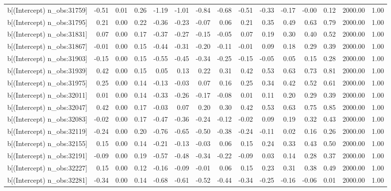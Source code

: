 \begin{table}[ht]
\begin{tabular}{rrrrrrrrrrrrrrr}
  b[(Intercept) n\_obs:31759] & -0.51 & 0.01 & 0.26 & -1.19 & -1.01 & -0.84 & -0.68 & -0.51 & -0.33 & -0.17 & -0.00 & 0.12 & 2000.00 & 1.00 \\ 
  b[(Intercept) n\_obs:31795] & 0.21 & 0.00 & 0.22 & -0.36 & -0.23 & -0.07 & 0.06 & 0.21 & 0.35 & 0.49 & 0.63 & 0.79 & 2000.00 & 1.00 \\ 
  b[(Intercept) n\_obs:31831] & 0.07 & 0.00 & 0.17 & -0.37 & -0.27 & -0.15 & -0.05 & 0.07 & 0.19 & 0.30 & 0.40 & 0.52 & 2000.00 & 1.00 \\ 
  b[(Intercept) n\_obs:31867] & -0.01 & 0.00 & 0.15 & -0.44 & -0.31 & -0.20 & -0.11 & -0.01 & 0.09 & 0.18 & 0.29 & 0.39 & 2000.00 & 1.00 \\ 
  b[(Intercept) n\_obs:31903] & -0.15 & 0.00 & 0.15 & -0.55 & -0.45 & -0.34 & -0.25 & -0.15 & -0.05 & 0.05 & 0.15 & 0.28 & 2000.00 & 1.00 \\ 
  b[(Intercept) n\_obs:31939] & 0.42 & 0.00 & 0.15 & 0.05 & 0.13 & 0.22 & 0.31 & 0.42 & 0.53 & 0.63 & 0.73 & 0.81 & 2000.00 & 1.00 \\ 
  b[(Intercept) n\_obs:31975] & 0.25 & 0.00 & 0.14 & -0.13 & -0.03 & 0.07 & 0.16 & 0.25 & 0.34 & 0.42 & 0.52 & 0.61 & 2000.00 & 1.00 \\ 
  b[(Intercept) n\_obs:32011] & 0.01 & 0.00 & 0.14 & -0.33 & -0.26 & -0.17 & -0.08 & 0.01 & 0.11 & 0.20 & 0.29 & 0.39 & 2000.00 & 1.00 \\ 
  b[(Intercept) n\_obs:32047] & 0.42 & 0.00 & 0.17 & -0.03 & 0.07 & 0.20 & 0.30 & 0.42 & 0.53 & 0.63 & 0.75 & 0.85 & 2000.00 & 1.00 \\ 
  b[(Intercept) n\_obs:32083] & -0.02 & 0.00 & 0.17 & -0.47 & -0.36 & -0.24 & -0.12 & -0.02 & 0.09 & 0.19 & 0.32 & 0.43 & 2000.00 & 1.00 \\ 
  b[(Intercept) n\_obs:32119] & -0.24 & 0.00 & 0.20 & -0.76 & -0.65 & -0.50 & -0.38 & -0.24 & -0.11 & 0.02 & 0.16 & 0.26 & 2000.00 & 1.00 \\ 
  b[(Intercept) n\_obs:32155] & 0.15 & 0.00 & 0.14 & -0.21 & -0.13 & -0.03 & 0.06 & 0.15 & 0.24 & 0.33 & 0.43 & 0.50 & 2000.00 & 1.00 \\ 
  b[(Intercept) n\_obs:32191] & -0.09 & 0.00 & 0.19 & -0.57 & -0.48 & -0.34 & -0.22 & -0.09 & 0.03 & 0.14 & 0.28 & 0.37 & 2000.00 & 1.00 \\ 
  b[(Intercept) n\_obs:32227] & 0.15 & 0.00 & 0.12 & -0.16 & -0.09 & -0.01 & 0.06 & 0.15 & 0.23 & 0.31 & 0.38 & 0.49 & 2000.00 & 1.00 \\ 
  b[(Intercept) n\_obs:32281] & -0.34 & 0.00 & 0.14 & -0.68 & -0.61 & -0.52 & -0.44 & -0.34 & -0.25 & -0.16 & -0.06 & 0.01 & 2000.00 & 1.00 \\ 

\end{tabular}
\end{table}
